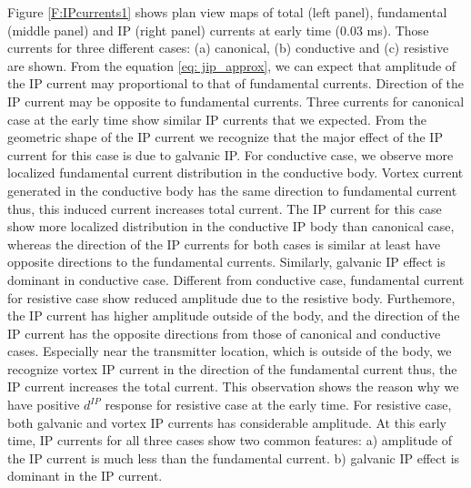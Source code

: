 \documentclass[a4paper, 11pt]{article}
\newcommand{\dip}{d^{IP}}
\begin{document}
Figure \ref{F:IPcurrents1} shows plan view maps of total (left panel), fundamental (middle panel) and IP (right panel) currents at early time (0.03 ms).  Those currents for three different cases: (a) canonical, (b) conductive and (c) resistive are shown. From the equation \ref{eq: jip_approx}, we can expect that amplitude of the IP current may proportional to that of fundamental currents. Direction of the IP current may be opposite to fundamental currents. Three currents for canonical case at the early time show similar IP currents that we expected. From the geometric shape of the IP current we recognize that the major effect of the IP current for this case is due to galvanic IP. For conductive case, we observe more localized fundamental current distribution in the conductive body. Vortex current generated in the conductive body has the same direction to fundamental current thus, this induced current increases total current.  The IP current for this case show more localized distribution in the conductive IP body than canonical case, whereas the direction of the IP currents for both cases is similar at least have opposite directions to the fundamental currents. Similarly, galvanic IP effect is dominant in conductive case. Different from conductive case, fundamental current for resistive case show reduced amplitude due to the resistive body. Furthemore, the IP current has higher amplitude outside of the body, and the direction of the IP current has the opposite directions from those of canonical and conductive cases. Especially near the transmitter location, which is outside of the body, we recognize vortex IP current in the direction of the fundamental current thus, the IP current increases the total current. This observation shows the reason why we have positive $\dip$ response for resistive case at the early time. For resistive case, both galvanic and vortex IP currents has considerable amplitude. At this early time, IP currents for all three cases show two common features: a) amplitude of the IP current is much less than the fundamental current. b) galvanic IP effect is dominant in the IP current. 
\end{document}
